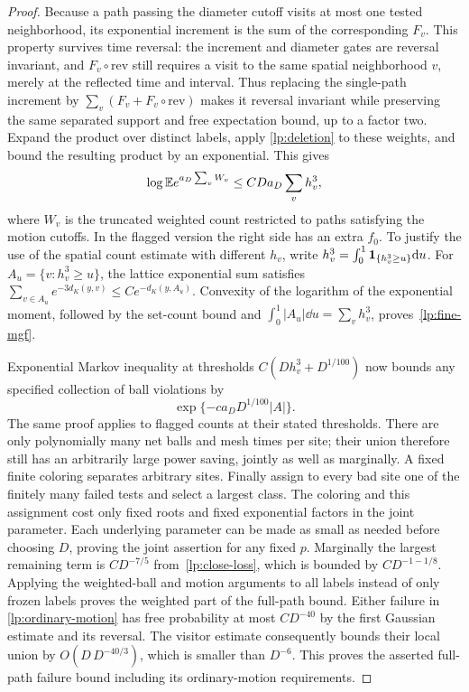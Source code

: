 \begin{proof}
Because a path passing the diameter cutoff visits at most one tested
neighborhood, its exponential increment is the sum of the corresponding
$F_v$.  This property survives time reversal: the increment and diameter
gates are reversal invariant, and $F_v\circ\mathrm{rev}$ still requires
a visit to the same spatial neighborhood $v$, merely at the reflected
time and interval.  Thus replacing the single-path increment by
$\sum_v(F_v+F_v\circ\mathrm{rev})$ makes it reversal invariant while
preserving the same separated support and free expectation bound, up to
a factor two.  Expand the product over distinct labels, apply
\eqref{lp:deletion} to these weights, and bound the resulting product
by an exponential.  This gives
\begin{equation}\label{lp:fine-mgf}
 \log\mathbb E e^{a_D\sum_v W_v}
 \leq C D a_D\sum_v h_v^3,
\end{equation}
where $W_v$ is the truncated weighted count restricted to paths
satisfying the motion cutoffs.  In the flagged version
the right side has an extra $f_0$.  To justify the use of the spatial
count estimate with different $h_v$, write
$h_v^3=\int_0^1\mathbf 1_{\{h_v^3\geq u\}}\mathrm d u$.
For $A_u=\{v:h_v^3\geq u\}$, the lattice exponential sum satisfies
$\sum_{v\in A_u}e^{-3d_K(y,v)}\leq C e^{-d_K(y,A_u)}$.
Convexity of the logarithm of the exponential moment, followed by
the set-count bound and
$\int_0^1|A_u|\dd u=\sum_vh_v^3$, proves~\eqref{lp:fine-mgf}.

Exponential Markov inequality at thresholds
$C(Dh_v^3+D^{1/100})$ now bounds any specified collection of ball
violations by
\[
 \exp\{-c a_D D^{1/100}|A|\}.
\]
The same proof applies to flagged counts at their stated thresholds.
There are only polynomially many net balls and mesh times per site;
their union therefore still has an arbitrarily large power saving,
jointly as well as marginally.  A fixed finite coloring separates
arbitrary sites.  Finally assign to every bad site one of the finitely
many failed tests and select a largest class.  The coloring and this
assignment cost only fixed roots and fixed exponential factors in
the joint parameter.  Each underlying parameter can be made as small
as needed before choosing $D$, proving the joint assertion for any
fixed $p$.  Marginally the largest remaining term is
$CD^{-7/5}$ from~\eqref{lp:close-loss}, which is bounded by
$CD^{-1-1/8}$.  Applying the weighted-ball and motion arguments to
all labels instead of only frozen labels proves the weighted part of
the full-path bound.  Either failure in \eqref{lp:ordinary-motion} has
free probability at most $CD^{-40}$ by the first Gaussian estimate and
its reversal.  The visitor estimate consequently bounds their local
union by $O(D\,D^{-40/3})$, which is smaller than $D^{-6}$.  This
proves the asserted full-path failure bound including its ordinary-motion
requirements.
\end{proof}

